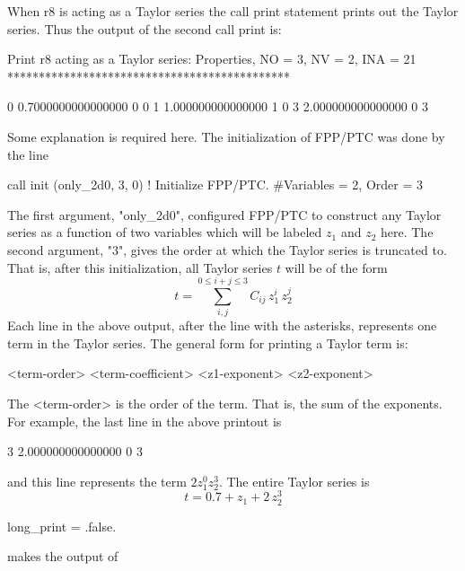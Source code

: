 \documentclass[english,12pt,article]{article} %
\begin{document}
When r8 is acting as a Taylor series the call print statement prints out the Taylor series. Thus the output of the second call print is:
\begin{example}
  Print r8 acting as a Taylor series:
Properties, NO =    3, NV =    2, INA =   21
 *********************************************

   0  0.7000000000000000       0  0
   1   1.000000000000000       1  0
   3   2.000000000000000       0  3
\end{example}
Some explanation is required here. The initialization of FPP/PTC was done by the line
\begin{example}
  call init (only_2d0, 3, 0)  ! Initialize FPP/PTC. #Variables = 2, Order = 3
\end{example}
The first argument, "only_2d0",  configured FPP/PTC to construct any Taylor series as a function of two variables which will be labeled $z_1$ and $z_2$ here. The second argument, "3", gives the order at which the Taylor series is truncated to. That is, after this initialization, all Taylor series $t$ will be of the form
\begin{equation}
    t = \sum_{i,j}^{0 \le i+j \le 3} C_{ij} \, z_1^i \, z_2^j
\end{equation}
Each line in the above output, after the line with the asterisks, represents one term in the Taylor series. The general form for printing a Taylor term is:
\begin{example}
    <term-order>   <term-coefficient>    <z1-exponent>  <z2-exponent>
\end{example}
The <term-order> is the order of the term. That is, the sum of the exponents. For example, the last line in the above printout is
\begin{example}
   3   2.000000000000000       0  3
\end{example}
and this line represents the term $2 z_1^0 z_2^3$. The entire Taylor series is 
\begin{equation}
    t = 0.7 + z_1 + 2 \, z_2^3
\end{equation}


\begin{example}
  long_print = .false.
\end{example}
makes the output of 



\end{document}
